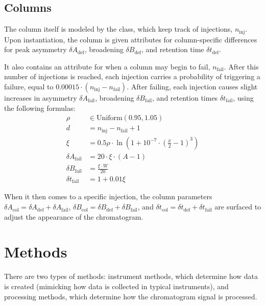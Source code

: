 \documentclass{article}
\newcommand{\cbtt}[1]{\textcolor{codepurple}{\fontseries{b}\selectfont{\texttt{#1}}}}
\begin{document}
\subsection{Columns}\label{sec:col}

The column itself is modeled by the \cbtt{Column} class, which keep track of injections, $n_{\text{inj}}$. Upon instantiation, the column is given attributes for column-specific differences for peak asymmetry $\delta A_{\text{def}}$, broadening $\delta B_{\text{def}}$, and retention time $\delta t_{\text{def}}$. 

It also contains an attribute for when a column may begin to fail, $n_{\text{fail}}$. After this number of injections is reached, each injection carries a probability of triggering a failure, equal to $0.00015 \cdot (n_{\text{inj}} - n_{\text{fail}})$. After failing, each injection causes slight increases in asymmetry $\delta A_{\text{fail}}$, broadening $\delta B_{\text{fail}}$, and retention times $\delta t_{\text{fail}}$, using the following formulas: 
\begin{align}
\rho &\in \text{Uniform}(0.95, 1.05)\nonumber \\
d &= n_{\text{inj}} - n_{\text{fail}} + 1 \nonumber \\
\xi &= 0.5 \rho \cdot \ln \left(1 + 10^{-7} \cdot \left(\frac{x}{2} -1 \right)^3 \right) \nonumber \\
\delta A_{\text{fail}} &= 20 \cdot \xi \cdot (A -1) \\
\delta B_{\text{fail}} &= \frac{\xi \cdot W}{20}  \\
\delta t_{\text{fail}} &= 1 + 0.01 \xi
\end{align}

When it then comes to a specific injection, the column parameters $\delta A_{\text{col}} = \delta A_{\text{def}} + \delta A_{\text{fail}}$, $\delta B_{\text{col}} = \delta B_{\text{def}} + \delta B_{\text{fail}}$, and $\delta t_{\text{col}} = \delta t_{\text{def}} + \delta t_{\text{fail}}$ are surfaced to adjust the appearance of the chromatogram.

\section{Methods}\label{sec:methods}
There are two types of methods: instrument methods, which determine how data is created (mimicking how data is collected in typical instruments), and processing methods, which determine how the chromatogram signal is processed. 
\end{document}
